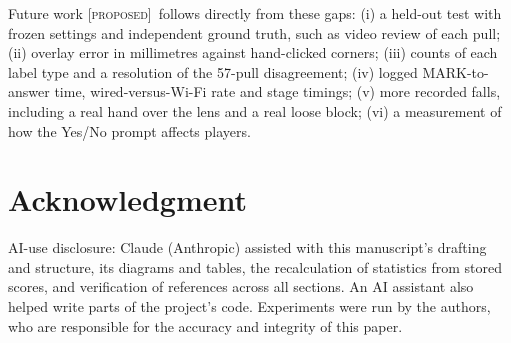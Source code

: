 \documentclass[conference,10pt]{IEEEtran}
\newcommand{\evP}{\textsc{[proposed]}}
\begin{document}
Future work \evP\ follows directly from these gaps: (i) a held-out test with frozen settings and independent ground truth, such as video review of each pull; (ii) overlay error in millimetres against hand-clicked corners; (iii) counts of each label type and a resolution of the 57-pull disagreement; (iv) logged MARK-to-answer time, wired-versus-Wi-Fi rate and stage timings; (v) more recorded falls, including a real hand over the lens and a real loose block; (vi) a measurement of how the Yes/No prompt affects players.

\section*{Acknowledgment}
AI-use disclosure: Claude (Anthropic) assisted with this manuscript's drafting and structure, its diagrams and tables, the recalculation of statistics from stored scores, and verification of references across all sections. An AI assistant also helped write parts of the project's code. Experiments were run by the authors, who are responsible for the accuracy and integrity of this paper.
\end{document}
